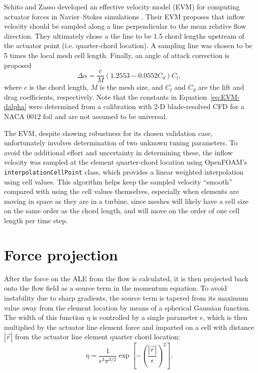 Schito and Zasso developed an effective velocity model (EVM) for computing
actuator forces in Navier--Stokes simulations \cite{Schito2014}. Their EVM
proposes that inflow velocity should be sampled along a line perpendicular to
the mean relative flow direction. They ultimately chose a the line to be 1.5
chord lengths upstream of the actuator point (i.e. quarter-chord location). A
sampling line was chosen to be 5 times the local mesh cell length. Finally, an
angle of attack correction is proposed
\begin{equation}
    \Delta \alpha = \frac{c}{M} (1.2553 - 0.0552 C_d) C_l,
    \label{eq:EVM-dalpha}
\end{equation}
where $c$ is the chord length, $M$ is the mesh size, and $C_l$ and $C_d$ are the
lift and drag coefficients, respectively. Note that the constants in
Equation~\ref{eq:EVM-dalpha} were determined from a calibration with 2-D
blade-resolved CFD for a NACA 0012 foil and are not assumed to be universal.

The EVM, despite showing robustness for its chosen validation case,
unfortunately involves determination of two unknown tuning parameters. To avoid
the additional effort and uncertainty in determining these, the inflow velocity
was sampled at the element quarter-chord location using OpenFOAM's
\texttt{interpolationCellPoint} class, which provides a linear weighted
interpolation using cell values. This algorithm helps keep the sampled velocity
``smooth'' compared with using the cell values themselves, especially when
elements are moving in space as they are in a turbine, since meshes will likely
have a cell size on the same order as the chord length, and will move on the
order of one cell length per time step.


\section{Force projection}

After the force on the ALE from the flow is calculated, it is then projected
back onto the flow field as a source term in the momentum equation. To avoid
instability due to sharp gradients, the source term is tapered from its maximum
value away from the element location by means of a spherical Gaussian function.
The width of this function $\eta$ is controlled by a single parameter
$\epsilon$, which is then multiplied by the actuator line element force and
imparted on a cell with distance $| \vec{r} |$ from the actuator line element
quarter chord location:
\begin{equation}
    \eta = \frac{1}{\epsilon^3 \pi^{3/2}} \exp 
    \left[ - \left( \frac{| \vec{r} |}{\epsilon} \right)^2 \right].
    \label{eq:projection}
\end{equation}

